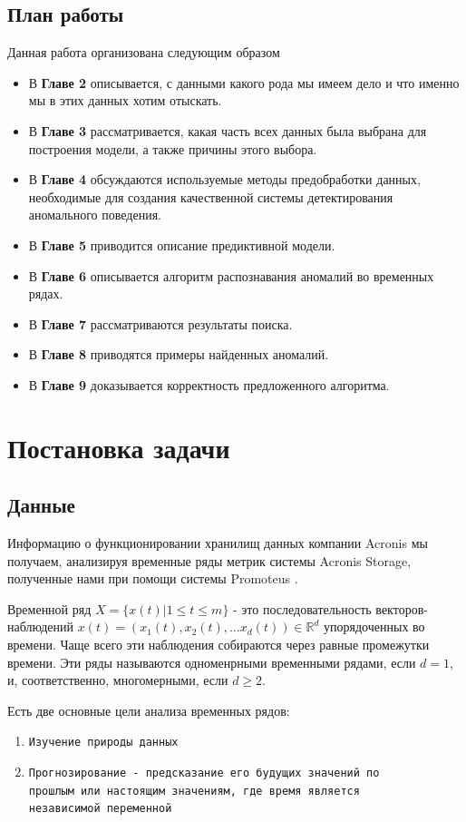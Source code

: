 \documentclass[14pt, a4paper]{extarticle}
\renewcommand{\leq}{\leqslant}
\renewcommand{\geq}{\geqslant}
\begin{document}
	\subsection{План работы}
	Данная работа организована следующим образом 
	\begin{itemize}
	\item В \textbf{Главе 2} описывается, с данными какого рода мы имеем дело и что именно мы в этих данных хотим отыскать. 
	\item В \textbf{Главе 3} рассматривается, какая часть всех данных была выбрана для построения модели, а также причины этого выбора. 
	\item В \textbf{Главе 4} обсуждаются используемые методы предобработки данных, необходимые для создания качественной системы детектирования аномального поведения. 
	\item В \textbf{Главе 5} приводится описание предиктивной модели.
	\item В \textbf{Главе 6} описывается алгоритм распознавания аномалий во временных рядах.
	\item В \textbf{Главе 7} рассматриваются результаты поиска.
	\item В \textbf{Главе 8} приводятся примеры найденных аномалий.
	\item В \textbf{Главе 9} доказывается корректность предложенного алгоритма.
	\end{itemize}

	\newpage
	\section{Постановка задачи}
	\subsection{Данные}
	Информацию о функционировании хранилищ данных компании Acronis мы получаем, анализируя временные ряды метрик системы Acronis Storage, полученные нами при помощи системы Promoteus \cite{cite1}. 
	
	Временной ряд $X = \{x(t)|1 \leq t \leq m\}$ - это последовательность векторов-наблюдений $x(t) = (x_1(t), x_2(t), \dots x_d(t)) \in \mathbb {R}^d $ упорядоченных во времени. Чаще всего эти наблюдения собираются  через равные промежутки времени. Эти ряды  называются одноменрными временными рядами, если $d = 1$, и, соответственно,  многомерными, если $d \geq 2$.  
	
	Есть две основные цели анализа временных рядов:
 \begin{enumerate}
	 	\item \texttt{Изучение природы данных}
		 \item \texttt{Прогнозирование - предсказание его будущих значений по \\ прошлым или настоящим значениям, где время является \\ независимой переменной}
	 \end{enumerate}\label{list_of_metrics}
	 
\end{document}
